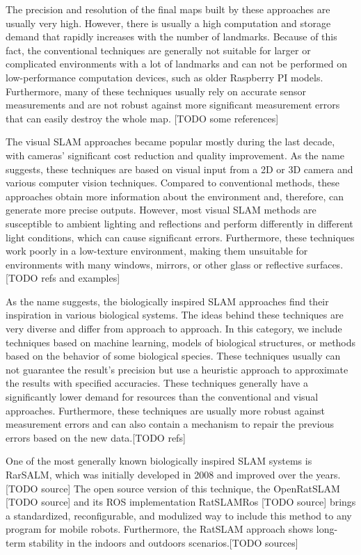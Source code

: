 The precision and resolution of the final maps built by these approaches are usually very high. However, there is usually a high computation and storage demand that rapidly increases with the number of landmarks. Because of this fact, the conventional techniques are generally not suitable for larger or complicated environments with a lot of landmarks and can not be performed on low-performance computation devices, such as older Raspberry PI models. Furthermore, many of these techniques usually rely on accurate sensor measurements and are not robust against more significant measurement errors that can easily destroy the whole map. [TODO some references]\par
The visual SLAM approaches became popular mostly during the last decade, with cameras' significant cost reduction and quality improvement. As the name suggests, these techniques are based on visual input from a 2D or 3D camera and various computer vision techniques. Compared to conventional methods, these approaches obtain more information about the environment and, therefore, can generate more precise outputs. However, most visual SLAM methods are susceptible to ambient lighting and reflections and perform differently in different light conditions, which can cause significant errors. Furthermore, these techniques work poorly in a low-texture environment, making them unsuitable for environments with many windows, mirrors, or other glass or reflective surfaces.[TODO refs and examples]\par
As the name suggests, the biologically inspired SLAM approaches find their inspiration in various biological systems. The ideas behind these techniques are very diverse and differ from approach to approach. In this category, we include techniques based on machine learning, models of biological structures, or methods based on the behavior of some biological species. These techniques usually can not guarantee the result's precision but use a heuristic approach to approximate the results with specified accuracies. These techniques generally have a significantly lower demand for resources than the conventional and visual approaches. Furthermore, these techniques are usually more robust against measurement errors and can also contain a mechanism to repair the previous errors based on the new data.[TODO refs]\par
One of the most generally known biologically inspired SLAM systems is RarSALM, which was initially developed in 2008 and improved over the years. [TODO source] The open source version of this technique, the OpenRatSLAM [TODO source] and its ROS implementation RatSLAMRos [TODO source] brings a standardized, reconfigurable, and modulized way to include this method to any program for mobile robots. Furthermore, the RatSLAM approach shows long-term stability in the indoors and outdoors scenarios.[TODO sources]\par
